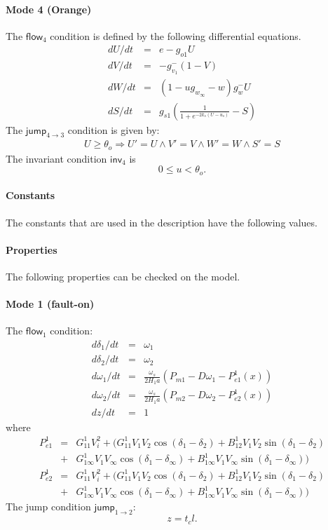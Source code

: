 \documentclass[envcountsect]{llncs}
\newcommand{\flow}{\mathsf{flow}}
\newcommand{\jump}{\mathsf{jump}}
\newcommand{\inv}{\mathsf{inv}}
\begin{document}
\paragraph{Mode 4 (Orange)}
The $\flow_4$ condition is defined by the following differential equations.
\begin{eqnarray*}
dU/dt &=& e  -g_{o1}U\\
dV/dt &=& -g_{v_1}^-(1- V)\\
dW/dt &=& (1 - ug_{w_{\infty}} - w) g_w^- U\\
dS/dt &=& g_{s1}(\frac{1}{1+e^{-2k_s(U-u_s)}} - S)
\end{eqnarray*}
The $\jump_{4\rightarrow 3}$ condition is given by:
\begin{eqnarray*}
U \geq \theta_o \Longrightarrow U' = U \wedge V' = V \wedge W' = W \wedge S'
= S
\end{eqnarray*}
The invariant condition $\inv_4$ is
$$0\leq u< \theta_o.$$

\paragraph{Constants} The constants that are used in the description have the
following values. 

\paragraph{Properties}
The following properties can be checked on the model. 


\paragraph{Mode 1 (fault-on)}
The $\flow_1$ condition:
\begin{eqnarray*}
d\delta_1/dt &=& \omega_1\\
d\delta_2/dt &=& \omega_2\\
d\omega_1/dt &=& \frac{\omega_s}{2H_1a}(P_{m1} - D\omega_1 - P_{e1}^1(x))\\
d\omega_2/dt &=& \frac{\omega_s}{2H_1a}(P_{m2} - D\omega_2 - P_{e2}^1(x))\\
dz/dt &=& 1
\end{eqnarray*}
where
\begin{eqnarray*}
P_{e1}^1 &=& G_{11}^1V_i^2 + \Big(G_{11}^1 V_1V_2\cos(\delta_1-\delta_2) +
B_{12}^1 V_1V_2\sin(\delta_1-\delta_2)\\
&+& G_{1\infty}^1
V_1V_{\infty}\cos(\delta_1-\delta_{\infty}) + B_{1\infty}^1
V_1V_{\infty}\sin(\delta_1-\delta_{\infty}) \Big)\\
P_{e2}^1 &=& G_{11}^1V_i^2 + \Big(G_{11}^1 V_1V_2\cos(\delta_1-\delta_2) +
B_{12}^1 V_1V_2\sin(\delta_1-\delta_2)\\
&+& G_{1\infty}^1
V_1V_{\infty}\cos(\delta_1-\delta_{\infty}) + B_{1\infty}^1
V_1V_{\infty}\sin(\delta_1-\delta_{\infty}) \Big)
\end{eqnarray*}
The jump condition $\jump_{1 \rightarrow 2}:$
$$z = t_cl.$$
\end{document}
